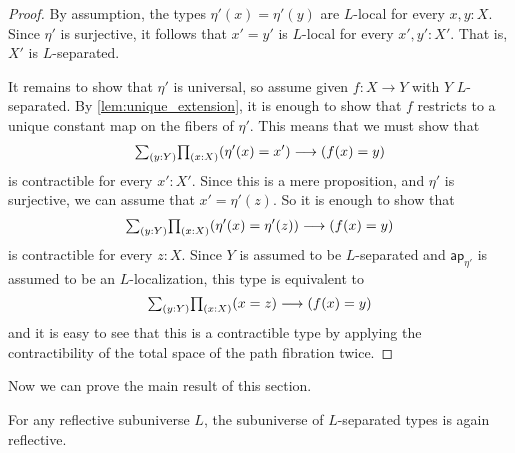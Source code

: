 \begin{proof}
By assumption, the types $\eta'(x) = \eta'(y)$ are $L$-local for every $x, y : X$.
Since $\eta'$ is surjective, it follows that $x' = y'$ is $L$-local
for every $x', y' : X'$.
That is, $X'$ is $L$-separated.

It remains to show that $\eta'$ is universal, so assume given $f : X \to Y$
with $Y$ $L$-separated.
By \cref{lem:unique_extension}, it is enough to show that $f$ restricts to a unique constant map
on the fibers of $\eta'$. This means that we must show that
\[
  \sm{y:Y}\prd{x:X} (\eta'(x)=x') \lra (f(x)=y)
\]
is contractible for every $x':X'$.
Since this is a mere proposition, and $\eta'$ is surjective, we can assume that
$x' = \eta'(z)$.  So it is enough to show that
\[
  \sm{y:Y}\prd{x:X} (\eta'(x)=\eta'(z)) \lra (f(x)=y)
\]
is contractible for every $z:X$.
Since $Y$ is assumed to be $L$-separated and $\mathsf{ap}_{\eta'}$ is assumed to be an $L$-localization,
this type is equivalent to
\[
  \sm{y:Y}\prd{x:X} (x=z) \lra (f(x)=y)
\]
and it is easy to see that this is a contractible type by applying the contractibility of
the total space of the path fibration twice.
\end{proof}

Now we can prove the main result of this section.

\begin{thm}\label{thm:Lsep}
For any reflective subuniverse $L$, the subuniverse of $L$-separated types is again reflective.
\end{thm}

